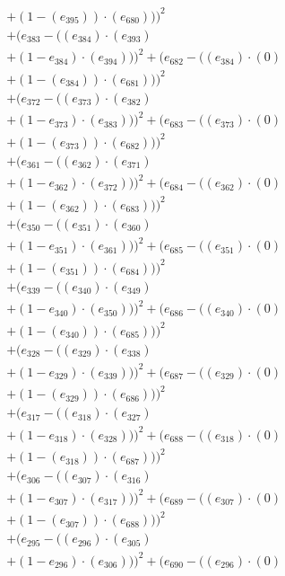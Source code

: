 \documentclass[10pt, a4paper]{article}
\begin{document}
\begin{small}
\begin{align*}
& + (1 - (e_{395})) \cdot (e_{680})))^{2} \\
& + (e_{383} - ((e_{384})  \cdot  (e_{393}) \\
& + (1 - e_{384})  \cdot  (e_{394})))^{2} + (e_{682} - ((e_{384}) \cdot (0) \\
& + (1 - (e_{384})) \cdot (e_{681})))^{2} \\
& + (e_{372} - ((e_{373})  \cdot  (e_{382}) \\
& + (1 - e_{373})  \cdot  (e_{383})))^{2} + (e_{683} - ((e_{373}) \cdot (0) \\
& + (1 - (e_{373})) \cdot (e_{682})))^{2} \\
& + (e_{361} - ((e_{362})  \cdot  (e_{371}) \\
& + (1 - e_{362})  \cdot  (e_{372})))^{2} + (e_{684} - ((e_{362}) \cdot (0) \\
& + (1 - (e_{362})) \cdot (e_{683})))^{2} \\
& + (e_{350} - ((e_{351})  \cdot  (e_{360}) \\
& + (1 - e_{351})  \cdot  (e_{361})))^{2} + (e_{685} - ((e_{351}) \cdot (0) \\
& + (1 - (e_{351})) \cdot (e_{684})))^{2} \\
& + (e_{339} - ((e_{340})  \cdot  (e_{349}) \\
& + (1 - e_{340})  \cdot  (e_{350})))^{2} + (e_{686} - ((e_{340}) \cdot (0) \\
& + (1 - (e_{340})) \cdot (e_{685})))^{2} \\
& + (e_{328} - ((e_{329})  \cdot  (e_{338}) \\
& + (1 - e_{329})  \cdot  (e_{339})))^{2} + (e_{687} - ((e_{329}) \cdot (0) \\
& + (1 - (e_{329})) \cdot (e_{686})))^{2} \\
& + (e_{317} - ((e_{318})  \cdot  (e_{327}) \\
& + (1 - e_{318})  \cdot  (e_{328})))^{2} + (e_{688} - ((e_{318}) \cdot (0) \\
& + (1 - (e_{318})) \cdot (e_{687})))^{2} \\
& + (e_{306} - ((e_{307})  \cdot  (e_{316}) \\
& + (1 - e_{307})  \cdot  (e_{317})))^{2} + (e_{689} - ((e_{307}) \cdot (0) \\
& + (1 - (e_{307})) \cdot (e_{688})))^{2} \\
& + (e_{295} - ((e_{296})  \cdot  (e_{305}) \\
& + (1 - e_{296})  \cdot  (e_{306})))^{2} + (e_{690} - ((e_{296}) \cdot (0) \\

\end{align*}
\end{small}
\end{document}
